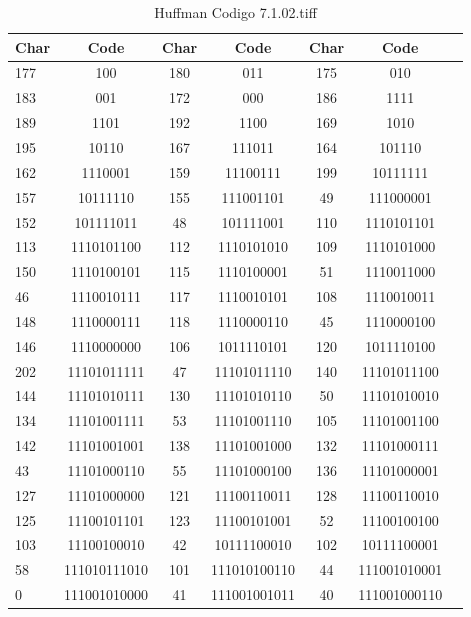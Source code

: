 \documentclass[conference,onecolumn,12pt]{IEEEtran}
\numberwithin{equation}{subsection}
\begin{document}
\begin{table}[H]
\centering
\caption{Huffman Codigo 7.1.02.tiff}
\label{tab:compression_tiff}
\begin{tabular}{lcccccc}
\hline
\textbf{Char} & \textbf{Code} & \textbf{Char} & \textbf{Code} & \textbf{Char} & \textbf{Code} \\
\hline
177 & 100 & 180 & 011 & 175 & 010 \\
183 & 001 & 172 & 000 & 186 & 1111 \\
189 & 1101 & 192 & 1100 & 169 & 1010 \\
195 & 10110 & 167 & 111011 & 164 & 101110 \\
162 & 1110001 & 159 & 11100111 & 199 & 10111111 \\
157 & 10111110 & 155 & 111001101 & 49 & 111000001 \\
152 & 101111011 & 48 & 101111001 & 110 & 1110101101 \\
113 & 1110101100 & 112 & 1110101010 & 109 & 1110101000 \\
150 & 1110100101 & 115 & 1110100001 & 51 & 1110011000 \\
46 & 1110010111 & 117 & 1110010101 & 108 & 1110010011 \\
148 & 1110000111 & 118 & 1110000110 & 45 & 1110000100 \\
146 & 1110000000 & 106 & 1011110101 & 120 & 1011110100 \\
202 & 11101011111 & 47 & 11101011110 & 140 & 11101011100 \\
144 & 11101010111 & 130 & 11101010110 & 50 & 11101010010 \\
134 & 11101001111 & 53 & 11101001110 & 105 & 11101001100 \\
142 & 11101001001 & 138 & 11101001000 & 132 & 11101000111 \\
43 & 11101000110 & 55 & 11101000100 & 136 & 11101000001 \\
127 & 11101000000 & 121 & 11100110011 & 128 & 11100110010 \\
125 & 11100101101 & 123 & 11100101001 & 52 & 11100100100 \\
103 & 11100100010 & 42 & 10111100010 & 102 & 10111100001 \\
58 & 111010111010 & 101 & 111010100110 & 44 & 111001010001 \\
0 & 111001010000 & 41 & 111001001011 & 40 & 111001000110 \\
\hline
\end{tabular}
\end{table}
\end{document}
